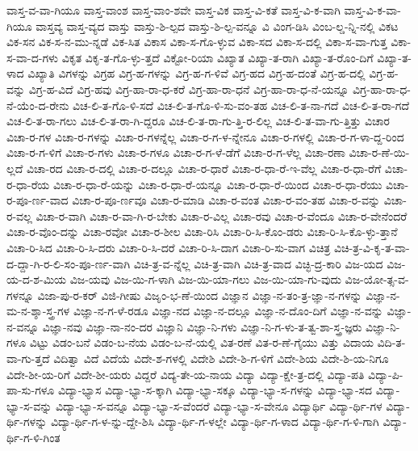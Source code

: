 {ವಾಸ್ತ-ವ-ವಾ-ಗಿಯೂ
ವಾಸ್ತ-ವಾಂಶ
ವಾಸ್ತ-ವಾಂ-ಶವೇ
ವಾಸ್ತ-ವಿಕ
ವಾಸ್ತ-ವಿ-ಕತೆ
ವಾಸ್ತ-ವಿ-ಕ-ವಾಗಿ
ವಾಸ್ತ-ವಿ-ಕ-ವಾ-ಗಿಯೂ
ವಾಸ್ತವ್ಯ
ವಾಸ್ತ-ವ್ಯದ
ವಾಸ್ತು
ವಾಸ್ತು-ಶಿ-ಲ್ಪದ
ವಾಸ್ತು-ಶಿ-ಲ್ಪ-ವನ್ನೂ
ವಿ
ವಿಂಗ-ಡಿಸಿ
ವಿಂಬ-ಲ್ಡ-ನ್ನಿ-ನಲ್ಲಿ
ವಿಕಟ
ವಿಕ-ಸನ
ವಿಕ-ಸ-ನ-ಮು-ನ್ನಡೆ
ವಿಕ-ಸಿತ
ವಿಕಾಸ
ವಿಕಾ-ಸ-ಗೊ-ಳ್ಳುವ
ವಿಕಾ-ಸದ
ವಿಕಾ-ಸ-ದಲ್ಲಿ
ವಿಕಾ-ಸ-ವಾ-ಗುತ್ತ
ವಿಕಾ-ಸ-ವಾ-ದ-ಗಳು
ವಿಕೃತ
ವಿಕೃ-ತ-ಗೊ-ಳ್ಳು-ತ್ತದೆ
ವಿಕ್ಟೋ-ರಿಯಾ
ವಿಖ್ಯಾತ
ವಿಖ್ಯಾ-ತ-ರಾಗಿ
ವಿಖ್ಯಾ-ತ-ರೊಂ-ದಿಗೆ
ವಿಖ್ಯಾ-ತ-ಳಾದ
ವಿಖ್ಯಾತಿ
ವಿಗಳನ್ನು
ವಿಗ್ರಹ
ವಿಗ್ರ-ಹ-ಗಳನ್ನು
ವಿಗ್ರ-ಹ-ಗ-ಳಿವೆ
ವಿಗ್ರ-ಹದ
ವಿಗ್ರ-ಹ-ದಂತೆ
ವಿಗ್ರ-ಹ-ದಲ್ಲಿ
ವಿಗ್ರ-ಹ-ವನ್ನು
ವಿಗ್ರ-ಹ-ವಿದೆ
ವಿಗ್ರ-ಹವು
ವಿಗ್ರ-ಹಾ-ರಾ-ಧ-ಕರೆ
ವಿಗ್ರ-ಹಾ-ರಾ-ಧನೆ
ವಿಗ್ರ-ಹಾ-ರಾ-ಧ-ನೆ-ಯನ್ನೂ
ವಿಗ್ರ-ಹಾ-ರಾ-ಧ-ನೆ-ಯೆಂ-ದ-ರೇನು
ವಿಚ-ಲಿ-ತ-ಗೊ-ಳಿ-ಸದೆ
ವಿಚ-ಲಿ-ತ-ಗೊ-ಳಿ-ಸು-ವಂ-ತಹ
ವಿಚ-ಲಿ-ತ-ನಾ-ಗದೆ
ವಿಚ-ಲಿ-ತ-ರಾ-ಗದೆ
ವಿಚ-ಲಿ-ತ-ರಾ-ಗಲು
ವಿಚ-ಲಿ-ತ-ರಾ-ಗಿ-ದ್ದರೂ
ವಿಚ-ಲಿ-ತ-ರಾ-ಗು-ತ್ತಿ-ರ-ಲಿಲ್ಲ
ವಿಚ-ಲಿ-ತ-ವಾ-ಗು-ತ್ತಿತ್ತು
ವಿಚಾರ
ವಿಚಾ-ರ-ಗಳ
ವಿಚಾ-ರ-ಗಳನ್ನು
ವಿಚಾ-ರ-ಗಳನ್ನೆಲ್ಲ
ವಿಚಾ-ರ-ಗ-ಳ-ನ್ನೇನೂ
ವಿಚಾ-ರ-ಗಳಲ್ಲಿ
ವಿಚಾ-ರ-ಗ-ಳಾ-ದ್ದ-ರಿಂದ
ವಿಚಾ-ರ-ಗ-ಳಿಗೆ
ವಿಚಾ-ರ-ಗಳು
ವಿಚಾ-ರ-ಗಳೂ
ವಿಚಾ-ರ-ಗ-ಳೆ-ಡೆಗೆ
ವಿಚಾ-ರ-ಗ-ಳೆಲ್ಲ
ವಿಚಾ-ರಣಾ
ವಿಚಾ-ರ-ಣೆ-ಯಿ-ಲ್ಲದೆ
ವಿಚಾ-ರದ
ವಿಚಾ-ರ-ದಲ್ಲಿ
ವಿಚಾ-ರ-ದಲ್ಲೂ
ವಿಚಾ-ರ-ಧಾರೆ
ವಿಚಾ-ರ-ಧಾ-ರೆ-ಇ-ವೆಲ್ಲ
ವಿಚಾ-ರ-ಧಾ-ರೆಗೆ
ವಿಚಾ-ರ-ಧಾ-ರೆಯ
ವಿಚಾ-ರ-ಧಾ-ರೆ-ಯನ್ನು
ವಿಚಾ-ರ-ಧಾ-ರೆ-ಯನ್ನೂ
ವಿಚಾ-ರ-ಧಾ-ರೆ-ಯಿಂದ
ವಿಚಾ-ರ-ಧಾ-ರೆಯು
ವಿಚಾ-ರ-ಪೂ-ರ್ಣ-ವಾದ
ವಿಚಾ-ರ-ಪೂ-ರ್ಣವೂ
ವಿಚಾ-ರ-ಮಾಡಿ
ವಿಚಾ-ರ-ವಂತ
ವಿಚಾ-ರ-ವಂ-ತಹ
ವಿಚಾ-ರ-ವನ್ನು
ವಿಚಾ-ರ-ವಲ್ಲ
ವಿಚಾ-ರ-ವಾಗಿ
ವಿಚಾ-ರ-ವಾ-ಗಿ-ರ-ಬೇಕು
ವಿಚಾ-ರ-ವಿಲ್ಲ
ವಿಚಾ-ರವು
ವಿಚಾ-ರ-ವೆಂದೂ
ವಿಚಾ-ರ-ವೇನೆಂದರೆ
ವಿಚಾ-ರ-ವೊಂ-ದನ್ನು
ವಿಚಾ-ರವೋ
ವಿಚಾ-ರ-ಶೀಲ
ವಿಚಾ-ರಿಸಿ
ವಿಚಾ-ರಿ-ಸಿ-ಕೊಂ-ಡರು
ವಿಚಾ-ರಿ-ಸಿ-ಕೊ-ಳ್ಳು-ತ್ತಾನೆ
ವಿಚಾ-ರಿ-ಸಿದ
ವಿಚಾ-ರಿ-ಸಿ-ದರು
ವಿಚಾ-ರಿ-ಸಿ-ದರೆ
ವಿಚಾ-ರಿ-ಸಿ-ದಾಗ
ವಿಚಾ-ರಿ-ಸು-ವಾಗ
ವಿಚಿತ್ರ
ವಿಚಿ-ತ್ರ-ವಿ-ಕೃ-ತ-ವಾ-ದ-ದ್ದಾ-ಗಿ-ರ-ಲಿ-ಸಂ-ಪೂ-ರ್ಣ-ವಾಗಿ
ವಿಚಿ-ತ್ರ-ವ-ನ್ನೆಲ್ಲ
ವಿಚಿ-ತ್ರ-ವಾಗಿ
ವಿಚಿ-ತ್ರ-ವಾದ
ವಿಚ್ಛಿ-ದ್ರ-ಕಾರಿ
ವಿಜ-ಯದ
ವಿಜ-ಯ-ದ-ಶ-ಮಿಯ
ವಿಜ-ಯವು
ವಿಜ-ಯಿ-ಗ-ಳಾಗಿ
ವಿಜ-ಯಿ-ಯಾ-ಗಲು
ವಿಜ-ಯಿ-ಯಾ-ಗು-ವುದು
ವಿಜ-ಯೋ-ತ್ಸ-ವ-ಗಳನ್ನೂ
ವಿಜಾ-ಪು-ರ-ಕರ್
ವಿಜಿ-ಗೀಷು
ವಿಜೃಂ-ಭ-ಣೆ-ಯಿಂದ
ವಿಜ್ಞಾನ
ವಿಜ್ಞಾ-ನ-ತಂ-ತ್ರ-ಜ್ಞಾ-ನ-ಗಳನ್ನು
ವಿಜ್ಞಾ-ನ-ಮ-ನ-ಶ್ಶಾ-ಸ್ತ್ರ-ಗಳ
ವಿಜ್ಞಾ-ನ-ಗ-ಳೆ-ರಡೂ
ವಿಜ್ಞಾ-ನದ
ವಿಜ್ಞಾ-ನ-ದಲ್ಲೂ
ವಿಜ್ಞಾ-ನ-ದೊಂ-ದಿಗೆ
ವಿಜ್ಞಾ-ನ-ವನ್ನು
ವಿಜ್ಞಾ-ನ-ವನ್ನೂ
ವಿಜ್ಞಾ-ನವು
ವಿಜ್ಞಾ-ನಾ-ನಂ-ದರ
ವಿಜ್ಞಾನಿ
ವಿಜ್ಞಾ-ನಿ-ಗಳು
ವಿಜ್ಞಾ-ನಿ-ಗ-ಳು-ತ-ತ್ವ-ಶಾ-ಸ್ತ್ರ-ಜ್ಞರು
ವಿಜ್ಞಾ-ನಿ-ಗಳೂ
ವಿಟ್ಟು
ವಿಡಂ-ಬನೆ
ವಿಡಂ-ಬ-ನೆಯ
ವಿಡಂ-ಬ-ನೆ-ಯಲ್ಲಿ
ವಿತ-ರಣೆ
ವಿತ-ರ-ಣೆ-ಗೈಯು
ವಿತ್ತು
ವಿದಾಯ
ವಿದಿ-ತ-ವಾ-ಗು-ತ್ತದೆ
ವಿದಿತ್ವಾ
ವಿದೆ
ವಿದೆಯೆ
ವಿದೇ-ಶ-ಗಳಲ್ಲಿ
ವಿದೇಶಿ
ವಿದೇ-ಶಿ-ಗ-ಳಿಗೆ
ವಿದೇ-ಶಿಯ
ವಿದೇ-ಶಿ-ಯ-ನಿಗೂ
ವಿದೇ-ಶೀ-ಯ-ರಿಗೆ
ವಿದೇ-ಶೀ-ಯರು
ವಿದ್ದರೆ
ವಿದ್ಯ-ತೇ-ಯ-ನಾಯ
ವಿದ್ಯಾ
ವಿದ್ಯಾ-ಕ್ಷೇ-ತ್ರ-ದಲ್ಲಿ
ವಿದ್ಯಾ-ಪತಿ
ವಿದ್ಯಾ-ಪಿ-ಪಾ-ಸು-ಗಳೂ
ವಿದ್ಯಾ-ಭ್ಯಾಸ
ವಿದ್ಯಾ-ಭ್ಯಾ-ಸ-ಕ್ಕಾಗಿ
ವಿದ್ಯಾ-ಭ್ಯಾ-ಸಕ್ಕೂ
ವಿದ್ಯಾ-ಭ್ಯಾ-ಸ-ಗಳನ್ನು
ವಿದ್ಯಾ-ಭ್ಯಾ-ಸದ
ವಿದ್ಯಾ-ಭ್ಯಾ-ಸ-ವನ್ನು
ವಿದ್ಯಾ-ಭ್ಯಾ-ಸ-ವನ್ನೂ
ವಿದ್ಯಾ-ಭ್ಯಾ-ಸ-ವೆಂದರೆ
ವಿದ್ಯಾ-ಭ್ಯಾ-ಸ-ವೇನೂ
ವಿದ್ಯಾರ್ಥಿ
ವಿದ್ಯಾ-ರ್ಥಿ-ಗಳ
ವಿದ್ಯಾ-ರ್ಥಿ-ಗಳನ್ನು
ವಿದ್ಯಾ-ರ್ಥಿ-ಗ-ಳ-ನ್ನು-ದ್ದೇ-ಶಿಸಿ
ವಿದ್ಯಾ-ರ್ಥಿ-ಗ-ಳಲ್ಲೇ
ವಿದ್ಯಾ-ರ್ಥಿ-ಗ-ಳಾದ
ವಿದ್ಯಾ-ರ್ಥಿ-ಗ-ಳಿ-ಗಾಗಿ
ವಿದ್ಯಾ-ರ್ಥಿ-ಗ-ಳಿ-ಗಿಂತ
}
